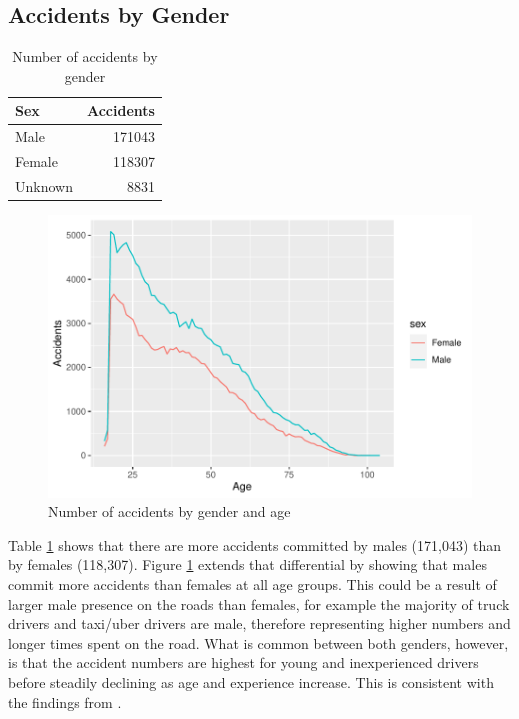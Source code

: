 \documentclass[11pt,a4paper,]{article}
\begin{document}
\subsection*{Accidents by Gender}

\begin{table}

\caption{\label{tab:accidents-gender-table}Number of accidents by gender}
\centering
\begin{tabular}[t]{l|r}
\hline
Sex & Accidents\\
\hline
Male & 171043\\
\hline
Female & 118307\\
\hline
Unknown & 8831\\
\hline
\end{tabular}
\end{table}

\begin{figure}
\centering
\includegraphics{Report_files/figure-latex/accidents-gender-plot-1.pdf}
\caption{\label{fig:accidents-gender-plot}Number of accidents by gender and age}
\end{figure}

Table \ref{tab:accidents-gender-table} shows that there are more accidents committed by males (171,043) than by females (118,307). Figure \ref{fig:accidents-gender-plot} extends that differential by showing that males commit more accidents than females at all age groups. This could be a result of larger male presence on the roads than females, for example the majority of truck drivers and taxi/uber drivers are male, therefore representing higher numbers and longer times spent on the road. What is common between both genders, however, is that the accident numbers are highest for young and inexperienced drivers before steadily declining as age and experience increase. This is consistent with the findings from \textcite{gislason1997medical}.
\end{document}

